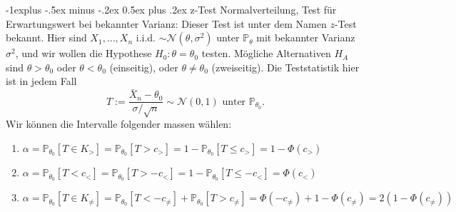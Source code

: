 \documentclass[10pt,landscape]{article}
\makeatletter
\renewcommand{\subsection}{\@startsection{subsection}{1}{0mm}%
                                {-1ex plus -.5ex minus -.2ex}%
                                {0.5ex plus .2ex}%
                                {\normalfont\large\bfseries}}
\renewcommand{\subsection}{\@startsection{subsection}{2}{0mm}%
                                {-1explus -.5ex minus -.2ex}%
                                {0.5ex plus .2ex}%
                                {\normalfont\normalsize\bfseries}}
\makeatother
\begin{document}
\begin{multicols}{3}
\subsection{z-Test}
Normalverteilung, Test für Erwartungswert bei bekannter Varianz: Dieser Test ist unter dem Namen $z$-Test bekannt. Hier sind $X_{1}, \ldots, X_{n}$ i.i.d. $\sim \mathcal{N}\left(\theta, \sigma^{2}\right)$ unter $\mathbb{P}_{\theta}$ mit bekannter Varianz $\sigma^{2}$, und wir wollen die Hypothese $H_{0}: \theta=\theta_{0}$ testen. 
Mögliche Alternativen $H_{A}$ sind $\theta>\theta_{0}$ oder $\theta<\theta_{0}$ (einseitig), oder $\theta \neq \theta_{0}$ (zweiseitig). 
Die Teststatistik hier ist in jedem Fall
$$
T:=\frac{\bar{X}_{n}-\theta_{0}}{\sigma / \sqrt{n}} \sim \mathcal{N}(0,1) \text { unter } \mathbb{P}_{\theta_{0}}.
$$
Wir können die Intervalle folgender massen wählen:
\begin{enumerate}
    \item $\alpha=\mathbb{P}_{\theta_{0}}\left[T \in K_{>}\right]=\mathbb{P}_{\theta_{0}}\left[T>c_{>}\right]=1-\mathbb{P}_{\theta_{0}}\left[T \leq c_{>}\right]=1-\Phi\left(c_{>}\right)$
    \item $\alpha=\mathbb{P}_{\theta_{0}}\left[T<c_{<}\right]=\mathbb{P}_{\theta_{0}}\left[T>-c_{<}\right] = 1 - \mathbb{P}_{\theta_{0}}\left[T \leq -c_{<}\right]=\Phi\left(c_{<}\right)$ 
    \item $\alpha=\mathbb{P}_{\theta_{0}}\left[T \in K_{\neq}\right]=\mathbb{P}_{\theta_{0}}\left[T<-c_{\neq}\right]+\mathbb{P}_{\theta_{0}}\left[T>c_{\neq}\right]=\Phi\left(-c_{\neq}\right)+1-\Phi\left(c_{\neq}\right)=2\left(1-\Phi\left(c_{\neq}\right)\right)$
\end{enumerate}

\end{multicols}
\end{document}
